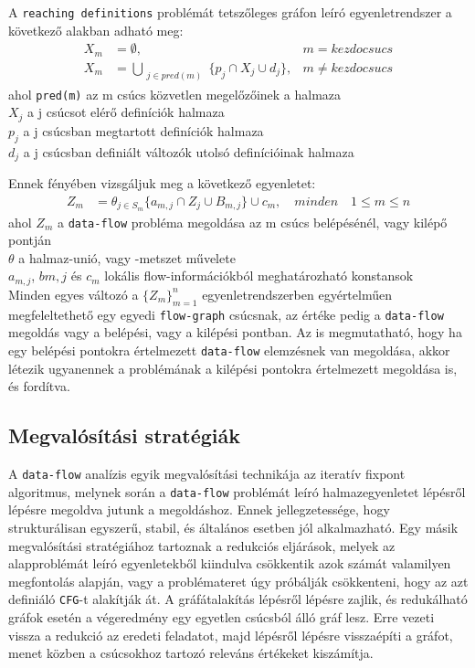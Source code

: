 \documentclass[12pt,a4paper]{article}
\begin{document}
A \texttt{reaching definitions} problémát tetszőleges gráfon leíró egyenletrendszer a következő alakban adható meg:
\begin{align}
X_m &= \emptyset, &m = kezdocsucs \nonumber \\
X_m &= \bigcup_{\substack {j \in pred(m)}} \{p_j \cap X_j \cup d_j \}, &m \neq kezdocsucs
\end{align}
ahol \texttt{pred(m)} az m csúcs közvetlen megelőzőinek a halmaza \\
$X_j$ a j csúcsot elérő definíciók halmaza \\
$p_j$ a j csúcsban megtartott definíciók halmaza \\
$d_j$ a j csúcsban definiált változók utolsó definícióinak halmaza

Ennek fényében vizsgáljuk meg a következő egyenletet:
\begin{align}
Z_m &= \theta_{j \in S_m}\{ a_{m,j} \cap Z_j \cup B_{m,j} \} \cup c_m, \quad minden \quad 1 \leqslant m \leqslant n
\end{align}
ahol $Z_m$ a \texttt{data-flow} probléma megoldása az m csúcs belépésénél, vagy kilépő pontján \\
$\theta$ a halmaz-unió, vagy -metszet művelete \\
$a_{m,j}$, $b{m,j}$ és $c_m$ lokális flow-információkból meghatározható konstansok \\

Minden egyes változó a $\{ Z_m \}_{m = 1}^{n}$ egyenletrendszerben egyértelműen megfeleltethető egy egyedi \texttt{flow-graph} csúcsnak, az értéke pedig a \texttt{data-flow} megoldás vagy a belépési, vagy a kilépési pontban. Az is megmutatható, hogy ha egy belépési pontokra értelmezett \texttt{data-flow} elemzésnek van megoldása, akkor létezik ugyanennek a problémának a kilépési pontokra értelmezett megoldása is, és fordítva.

\subsection{Megvalósítási stratégiák}
A \texttt{data-flow} analízis egyik megvalósítási technikája az iteratív fixpont algoritmus, melynek során a \texttt{data-flow} problémát leíró halmazegyenletet lépésről lépésre megoldva jutunk a megoldáshoz. Ennek jellegzetessége, hogy strukturálisan egyszerű, stabil, és általános esetben jól alkalmazható.
Egy másik megvalósítási stratégiához tartoznak a redukciós eljárások, melyek az alapproblémát leíró egyenletekből kiindulva csökkentik azok számát valamilyen megfontolás alapján, vagy a problémateret úgy próbálják csökkenteni, hogy az azt definiáló \texttt{CFG}-t alakítják át. A gráfátalakítás lépésről lépésre zajlik, és redukálható gráfok esetén a végeredmény egy egyetlen csúcsból álló gráf lesz. Erre vezeti vissza a redukció az eredeti feladatot, majd lépésről lépésre visszaépíti a gráfot, menet közben a csúcsokhoz tartozó releváns értékeket kiszámítja.
\end{document}
